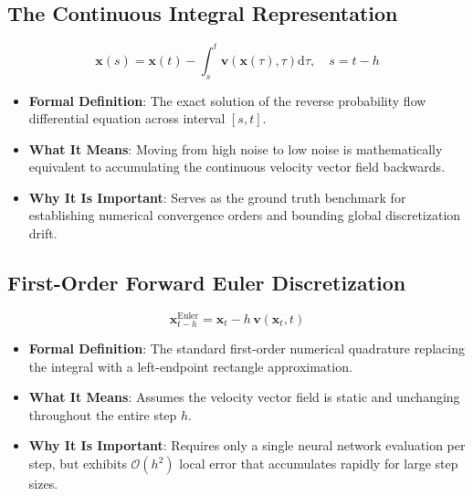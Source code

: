 \documentclass[11pt,a4paper]{article}
\theoremstyle{definition}
\begin{document}
\subsection{The Continuous Integral Representation}
{\boldmath
\begin{equation}
\mathbf{x}(s) = \mathbf{x}(t) - \int_s^t \mathbf{v}(\mathbf{x}(\tau), \tau) \mathrm{d}\tau, \quad s = t - h
\end{equation}
}
\begin{itemize}
    \item \textbf{Formal Definition}: The exact solution of the reverse probability flow differential equation across interval $[s, t]$.
    \item \textbf{What It Means}: Moving from high noise to low noise is mathematically equivalent to accumulating the continuous velocity vector field backwards.
    \item \textbf{Why It Is Important}: Serves as the ground truth benchmark for establishing numerical convergence orders and bounding global discretization drift.
\end{itemize}

\subsection{First-Order Forward Euler Discretization}
{\boldmath
\begin{equation}
\mathbf{x}_{t-h}^{\text{Euler}} = \mathbf{x}_t - h \, \mathbf{v}(\mathbf{x}_t, t)
\end{equation}
}
\begin{itemize}
    \item \textbf{Formal Definition}: The standard first-order numerical quadrature replacing the integral with a left-endpoint rectangle approximation.
    \item \textbf{What It Means}: Assumes the velocity vector field is static and unchanging throughout the entire step $h$.
    \item \textbf{Why It Is Important}: Requires only a single neural network evaluation per step, but exhibits $\mathcal{O}(h^2)$ local error that accumulates rapidly for large step sizes.
\end{itemize}
\end{document}
